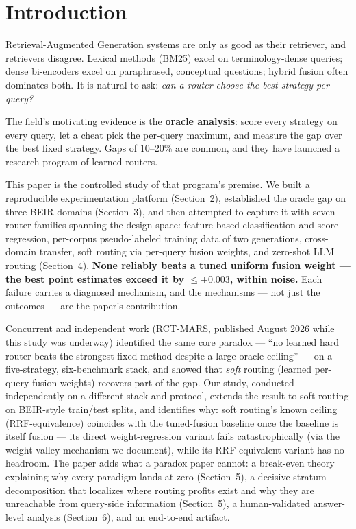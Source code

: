 \documentclass[11pt]{article}
\begin{document}
\section{Introduction}
Retrieval-Augmented Generation systems are only as good as their retriever, and retrievers disagree. Lexical methods (BM25) excel on terminology-dense queries; dense bi-encoders excel on paraphrased, conceptual questions; hybrid fusion often dominates both. It is natural to ask: \emph{can a router choose the best strategy per query?}

The field's motivating evidence is the \textbf{oracle analysis}: score every strategy on every query, let a cheat pick the per-query maximum, and measure the gap over the best fixed strategy. Gaps of 10--20\% are common, and they have launched a research program of learned routers.

This paper is the controlled study of that program's premise. We built a reproducible experimentation platform (Section~2), established the oracle gap on three BEIR domains (Section~3), and then attempted to capture it with seven router families spanning the design space: feature-based classification and score regression, per-corpus pseudo-labeled training data of two generations, cross-domain transfer, soft routing via per-query fusion weights, and zero-shot LLM routing (Section~4). \textbf{None reliably beats a tuned uniform fusion weight --- the best point estimates exceed it by ${\le}{+}0.003$, within noise.} Each failure carries a diagnosed mechanism, and the mechanisms --- not just the outcomes --- are the paper's contribution.

Concurrent and independent work (RCT-MARS, published August 2026 while this study was underway) identified the same core paradox --- ``no learned hard router beats the strongest fixed method despite a large oracle ceiling'' --- on a five-strategy, six-benchmark stack, and showed that \emph{soft} routing (learned per-query fusion weights) recovers part of the gap. Our study, conducted independently on a different stack and protocol, extends the result to soft routing on BEIR-style train/test splits, and identifies why: soft routing's known ceiling (RRF-equivalence) coincides with the tuned-fusion baseline once the baseline is itself fusion --- its direct weight-regression variant fails catastrophically (via the weight-valley mechanism we document), while its RRF-equivalent variant has no headroom. The paper adds what a paradox paper cannot: a break-even theory explaining why every paradigm lands at zero (Section~5), a decisive-stratum decomposition that localizes where routing profits exist and why they are unreachable from query-side information (Section~5), a human-validated answer-level analysis (Section~6), and an end-to-end artifact.
\end{document}
